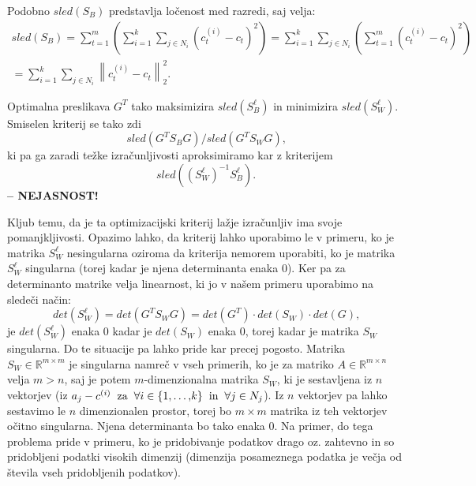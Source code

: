 \documentclass[mat1]{article}
\newcommand{\norm}[1]{\left\lVert#1\right\rVert}
\begin{document}
Podobno $sled(S_B)$ predstavlja ločenost med razredi, saj velja:
\begin{gather*} 
sled(S_B) = \sum_{t=1}^{m} (\sum_{i = 1}^{k} \sum_{j \in N_i}(c_t^{(i)} - c_t)^2)
= \sum_{i = 1}^{k} \sum_{j \in N_i} ( \sum_{t=1}^{m} (c_t^{(i)} - c_t)^2) \\
= \sum_{i = 1}^{k} \sum_{j \in N_i} \norm{ c_t^{(i)} - c_t}_2^2 \text{.}
\end{gather*}

Optimalna preslikava $G^T$ tako maksimizira $sled(S_{B}^{\ell})$ in minimizira $sled(S_{W}^{\ell})$. Smiselen kriterij se tako zdi $$sled( G^T S_B G) / sled( G^T S_W G) \text{,}$$ ki pa ga zaradi težke izračunljivosti aproksimiramo kar z kriterijem $$sled((S_W^\ell)^{-1}S_B^\ell) \text{.}$$
\textbf{-- NEJASNOST!}

Kljub temu, da je ta optimizacijski kriterij lažje izračunljiv ima svoje pomanjkljivosti. Opazimo lahko, da kriterij lahko uporabimo le v primeru, ko je matrika $S_W^\ell$ nesingularna oziroma da kriterija nemorem uporabiti, ko je matrika $S_W^\ell$ singularna (torej kadar je njena determinanta enaka 0). Ker pa za determinanto matrike velja linearnost, ki jo v našem primeru uporabimo na sledeči način:
$$ det(S_W^\ell) = det(G^T S_W G) = det(G^T) \cdot det(S_W) \cdot det(G) \text{,}
$$
je $det(S_W^\ell)$ enaka 0 kadar je $det(S_W)$ enaka 0, torej kadar je matrika $S_W$ singularna. Do te situacije pa lahko pride kar precej pogosto. Matrika $S_W \in  \mathbb{R}^{m \times m}$ je singularna namreč v vseh primerih, ko je za matriko $A \in  \mathbb{R}^{m \times n}$ velja $m > n$, saj je potem $m$-dimenzionalna matrika $S_W$, ki je sestavljena iz $n$ vektorjev (iz $a_j - c^{(i)} \hspace{2mm} \text{za} \hspace{2mm} \forall i \in \{1,\ldots \text{,} k\} \hspace{2mm} \text{in} \hspace{2mm} \forall j \in N_j $). Iz $n$ vektorjev pa lahko sestavimo le $n$ dimenzionalen prostor, torej bo $m \times m$ matrika iz teh vektorjev očitno singularna. Njena determinanta bo tako enaka 0.
Na primer, do tega problema pride v primeru, ko je pridobivanje podatkov drago oz. zahtevno in so pridobljeni podatki visokih dimenzij (dimenzija posameznega podatka je večja od števila vseh pridobljenih podatkov).
\end{document}

